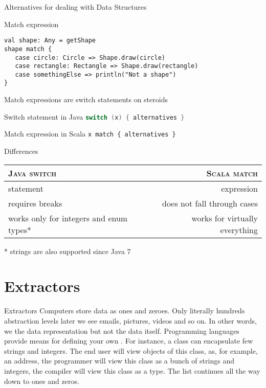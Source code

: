 \begin{frame}[fragile]{Alternatives for dealing with Data Structures}
\begin{block}{Match expression}
\begin{lstlisting}
val shape: Any = getShape
shape match {
   case circle: Circle => Shape.draw(circle)
   case rectangle: Rectangle => Shape.draw(rectangle)
   case somethingElse => println("Not a shape")
}
\end{lstlisting}
\end{block}
\end{frame}

\begin{frame}[fragile]{Match expressions are switch statements on steroids}
\begin{block}{Switch statement in Java}
\lstinline[language=java]!switch (x) { alternatives }!
\end{block}
\pause
\begin{block}{Match expression in Scala}
\lstinline!x match { alternatives }!
\end{block}
\pause
\begin{block}{Differences}
\begin{center}
\begin{tabular}{|l|r|}
\hline
\textsc{Java switch} & \textsc{Scala match}\\
\hline
\hline
statement & expression\\
\hline
requires breaks & does not fall through cases\\
\hline
works only for integers and enum types* & works for virtually everything\\
\hline
\end{tabular}
\end{center}
\end{block}
* strings are also supported since Java 7
\end{frame}
\section{Extractors}
\begin{frame}{Extractors}
Computers store data as ones and zeroes. Only literally hundreds abstraction
levels later we see emails, pictures, videos and so on. In other words,
we  the data representation but not the data itself. Programming
languages provide means for defining your own . For
instance, a class can encapsulate few strings and integers. The end user will
view objects of this class, as, for example, an address, the programmer will
view this class as a bunch of strings and integers, the compiler will view this
class as a type. The list continues all the way down to ones and zeros.
\end{frame}

